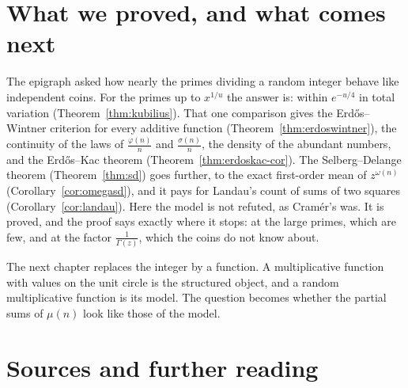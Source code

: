 \section{What we proved, and what comes next}

The epigraph asked how nearly the primes dividing a random integer behave like independent coins. For the primes up to $x^{1/u}$ the answer is: within $e^{-u/4}$ in total variation (Theorem~\ref{thm:kubilius}). That one comparison gives the Erd\H{o}s--Wintner criterion for every additive function (Theorem~\ref{thm:erdoswintner}), the continuity of the laws of $\frac{\varphi(n)}n$ and $\frac{\sigma(n)}n$, the density of the abundant numbers, and the Erd\H{o}s--Kac theorem (Theorem~\ref{thm:erdoskac-cor}). The Selberg--Delange theorem (Theorem~\ref{thm:sd}) goes further, to the exact first-order mean of $z^{\omega(n)}$ (Corollary~\ref{cor:omegasd}), and it pays for Landau's count of sums of two squares (Corollary~\ref{cor:landau}). Here the model is not refuted, as Cram\'er's was. It is proved, and the proof says exactly where it stops: at the large primes, which are few, and at the factor $\frac1{\Gamma(z)}$, which the coins do not know about.

The next chapter replaces the integer by a function. A multiplicative function with values on the unit circle is the structured object, and a random multiplicative function is its model. The question becomes whether the partial sums of $\mu(n)$ look like those of the model.

\section*{Sources and further reading}

